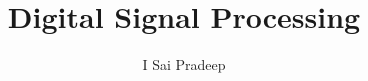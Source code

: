 \documentclass[journal,12pt,twocolumn]{IEEEtran}
\begin{document}
\let\StandardTheFigure\thefigure
\renewcommand{\thefigure}{\theproblem}



\def\putbox#1#2#3{\makebox[0in][l]{\makebox[#1][l]{}\raisebox{\baselineskip}[0in][0in]{\raisebox{#2}[0in][0in]{#3}}}}
     \def\rightbox#1{\makebox[0in][r]{#1}}
     \def\centbox#1{\makebox[0in]{#1}}
     \def\topbox#1{\raisebox{-\baselineskip}[0in][0in]{#1}}
     \def\midbox#1{\raisebox{-0.5\baselineskip}[0in][0in]{#1}}

\vspace{3cm}

\title{ 
Digital Signal Processing
}


%
%
%

\author{I Sai Pradeep%
}
% 
%
\end{document}
